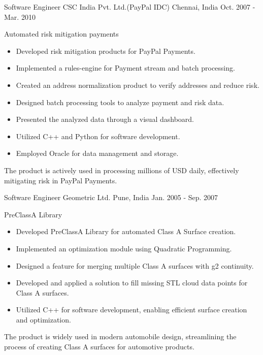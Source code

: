 \begin{cventries}
  \cventry
    {Software Engineer} %
    {CSC India Pvt. Ltd.(PayPal IDC)} %
    {Chennai, India} %
    {Oct. 2007 - Mar. 2010} %
    {
      \begin{cvitems} %
        \item{Automated risk mitigation payments}
        \begin{itemize}
          \item Developed risk mitigation products for PayPal Payments.
          \item Implemented a rules-engine for Payment stream and batch processing.
          \item Created an address normalization product to verify addresses and reduce risk.
          \item Designed batch processing tools to analyze payment and risk data.
          \item Presented the analyzed data through a visual dashboard.
          \item Utilized C++ and Python for software development.
          \item Employed Oracle for data management and storage.
        \end{itemize}
        The product is actively used in processing millions of USD daily, effectively mitigating risk in PayPal Payments.
      \end{cvitems}
    }

  \cventry
    {Software Engineer} %
    {Geometric Ltd.} %
    {Pune, India} %
    {Jan. 2005 - Sep. 2007} %
    {
      \begin{cvitems} %
        \item{PreClassA Library}
        \begin{itemize}
          \item Developed PreClassA Library for automated Class A Surface creation.
          \item Implemented an optimization module using Quadratic Programming.
          \item Designed a feature for merging multiple Class A surfaces with g2 continuity.
          \item Developed and applied a solution to fill missing STL cloud data points for Class A surfaces.
          \item Utilized C++ for software development, enabling efficient surface creation and optimization.
        \end{itemize}
        The product is widely used in modern automobile design, streamlining the process of creating Class A surfaces for automotive products.
      \end{cvitems}
    }


\end{cventries}
